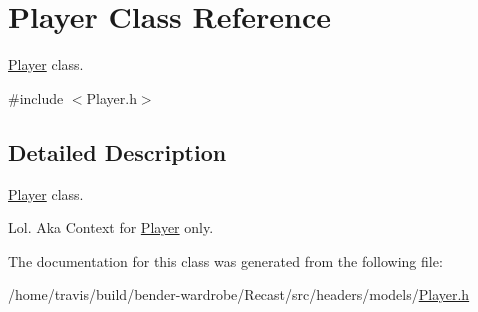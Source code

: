 \hypertarget{class_player}{\section{Player Class Reference}
\label{class_player}
}


\hyperlink{class_player}{Player} class.  




{\ttfamily \#include $<$Player.\-h$>$}



\subsection{Detailed Description}
\hyperlink{class_player}{Player} class. 

Lol. Aka Context for \hyperlink{class_player}{Player} only. 

The documentation for this class was generated from the following file\-:\begin{DoxyCompactItemize}
\item 
/home/travis/build/bender-\/wardrobe/\-Recast/src/headers/models/\hyperlink{_player_8h}{Player.\-h}\end{DoxyCompactItemize}
